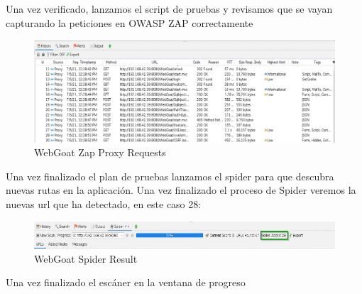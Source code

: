 \newpage

Una vez verificado, lanzamos el script de pruebas y revisamos que se vayan capturando la peticiones en OWASP ZAP correctamente

\begin{figure}[!htb]
    \captionsetup{width=1\linewidth}  
    \includegraphics[width=\linewidth]{./imagenes/04_1_1_02_WebGoat_ZapProxyRQST.png}
    \caption{WebGoat Zap Proxy Requests}  
    \label{fig:WebGoat Zap Proxy Requests}
\end{figure}

Una vez finalizado el plan de pruebas lanzamos el spider para que descubra nuevas rutas en la aplicación. Una vez finalizado 
el proceso de Spider veremos la nuevas url que ha detectado, en este caso 28:\\

\begin{figure}[!htb]
    \captionsetup{width=1\linewidth}  
    \includegraphics[width=\linewidth]{./imagenes/04_1_1_03_WebGoat_ZapProxySpiderResult.png}
    \caption{WebGoat Spider Result}  
    \label{fig:WebGoat Spider Result}
\end{figure}

\newpage
Una vez finalizado el escáner en la ventana de progreso\\

